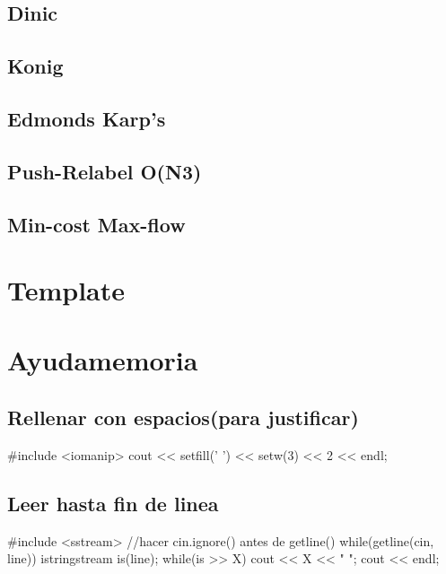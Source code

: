 \subsection{Dinic}
\subsection{Konig}
\subsection{Edmonds Karp's}
\subsection{Push-Relabel O(N3)}
\subsection{Min-cost Max-flow}


\section{Template}%


\section{Ayudamemoria}%
\subsection*{Rellenar con espacios(para justificar)}
\begin{code}
#include <iomanip>
cout << setfill(' ') << setw(3) << 2 << endl;
\end{code}
\subsection*{Leer hasta fin de linea}
\begin{code}
#include <sstream>
//hacer cin.ignore() antes de getline()
while(getline(cin, line)){
   	 istringstream is(line);
   	 while(is >> X)
   		 cout << X << " ";
   	 cout << endl;
}
\end{code}
